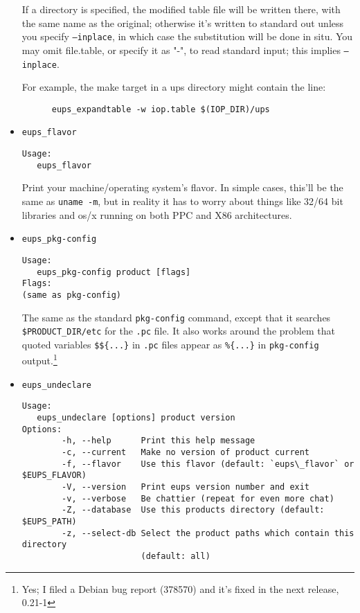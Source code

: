 \documentclass{article}
\newcommand{\code}[1]{\texttt{#1}}
\begin{document}
\begin{itemize}
If a directory is specified, the modified table file will be written
there, with the same name as the original; otherwise it's written to
standard out unless you specify \code{--inplace}, in which case the
substitution will be done in situ.
You may omit file.table, or specify it as "-", to read standard input;
this implies \code{--inplace}.

For example, the make target in a ups directory might contain the line:
\begin{verbatim}
      eups_expandtable -w iop.table $(IOP_DIR)/ups
\end{verbatim}


\item \code{eups\_flavor}
\begin{verbatim}
Usage:
   eups_flavor
\end{verbatim}
  
Print your machine/operating system's flavor.  In simple cases, this'll
be the same as \code{uname -m}, but in reality it has to worry about things
like 32/64 bit libraries and os/x running on both PPC and X86 architectures.


\item \code{eups\_pkg-config}
\begin{verbatim}
Usage:
   eups_pkg-config product [flags]
Flags:
(same as pkg-config)
\end{verbatim}

The same as the standard \code{pkg-config} command, except that it
searches \code{\$PRODUCT\_DIR/etc} for the \code{.pc} file.  It also
works around the problem that quoted variables \code{\$\$\{...\}}
in \code{.pc} files appear as \code{\%\{...\}} in \code{pkg-config} output.\footnote{
  Yes; I filed a Debian bug report (378570) and it's fixed in the next release, 0.21-1}
  

  \item \code{eups\_undeclare}
\begin{verbatim}
Usage:
   eups_undeclare [options] product version
Options:
        -h, --help      Print this help message
        -c, --current   Make no version of product current
        -f, --flavor    Use this flavor (default: `eups\_flavor` or $EUPS_FLAVOR)
        -V, --version   Print eups version number and exit
        -v, --verbose   Be chattier (repeat for even more chat)
        -Z, --database  Use this products directory (default: $EUPS_PATH)
        -z, --select-db Select the product paths which contain this directory 
                        (default: all)
\end{verbatim}
  

\end{itemize}
\end{document}
